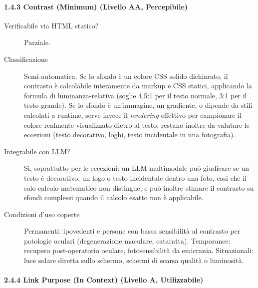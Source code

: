 \paragraph*{1.4.3 Contrast (Minimum) (Livello AA, Percepibile)}

\begin{description}

\item[Verificabile via HTML statico?] Parziale.

\item[Classificazione] Semi-automatica. Se lo sfondo è un colore CSS solido dichiarato, il contrasto è calcolabile interamente da markup e CSS statici, applicando la formula di \gls{luminanza-relativa} (soglie 4{,}5:1 per il testo normale, 3:1 per il testo grande). Se lo sfondo è un'immagine, un gradiente, o dipende da stili calcolati a runtime, serve invece il \emph{rendering} effettivo per campionare il colore realmente visualizzato dietro al testo; restano inoltre da valutare le eccezioni (testo decorativo, loghi, testo incidentale in una fotografia).

\item[Integrabile con LLM?] Sì, soprattutto per le eccezioni: un LLM multimodale può giudicare se un testo è decorativo, un logo o testo incidentale dentro una foto, casi che il solo calcolo matematico non distingue, e può inoltre stimare il contrasto su sfondi complessi quando il calcolo esatto non è applicabile.

\item[Condizioni d'uso coperte] Permanenti: ipovedenti e persone con bassa sensibilità al contrasto per patologie oculari (degenerazione maculare, cataratta). Temporanee: recupero post-operatorio oculare, fotosensibilità da emicrania. Situazionali: luce solare diretta sullo schermo, schermi di scarsa qualità o luminosità.

\end{description}

\paragraph*{2.4.4 Link Purpose (In Context) (Livello A, Utilizzabile)}

